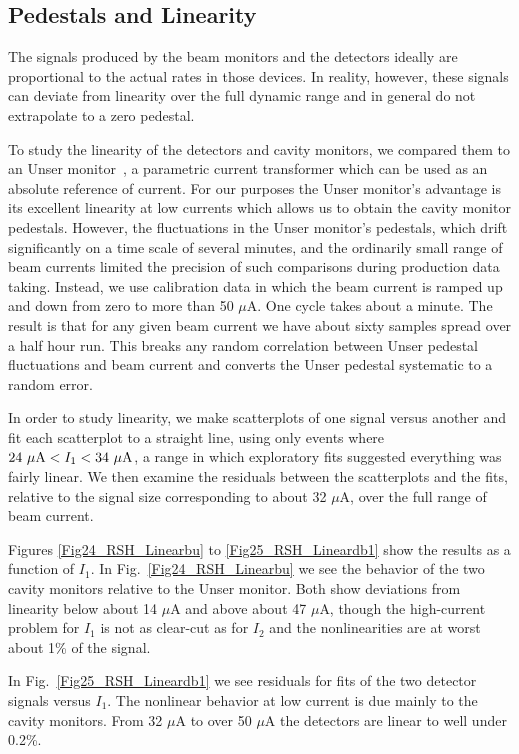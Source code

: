 
\subsection{Pedestals and Linearity}

The signals produced by the beam monitors and the detectors
ideally are proportional to the actual rates in those devices.  In
reality, however, these signals can deviate from linearity over the
full dynamic range and in general do not extrapolate to a zero
pedestal.  

To study the linearity of the detectors and cavity monitors, 
we compared them to an Unser monitor~\cite{Unser},
a parametric current transformer
which can be used as an absolute reference of current.  
For our purposes the Unser monitor's advantage
is its excellent linearity at low currents
which allows us to obtain the cavity monitor pedestals.
However, the fluctuations in the Unser monitor's pedestals, 
which drift significantly on a time scale of 
several minutes, and the ordinarily small 
range of beam currents limited 
the precision of such comparisons during production data taking.
Instead, we use calibration data in which the beam
current is ramped up and down from zero to more 
than 50 $\mu$A.  One cycle takes about a minute.  
The result is that for any given beam
current we have about sixty samples spread over 
a half hour run.  This breaks any random correlation 
between Unser pedestal fluctuations and
beam current and converts the Unser pedestal systematic 
to a random error.

In order to study linearity, we make scatterplots of one signal versus
another and  fit each scatterplot to a straight line, using only
events where $24~\mu{\rm A} < I_1 < 34~\mu{\rm A}$, a range in which
exploratory fits suggested everything was fairly linear.  We then
examine the residuals between the scatterplots and the fits, relative
to the signal size corresponding to about 32 $\mu$A, over the full
range of beam current.

Figures \ref{Fig24_RSH_Linearbu} to \ref{Fig25_RSH_Lineardb1} show the 
results as a
function of $I_1$.  
In Fig.~\ref{Fig24_RSH_Linearbu}
we see the behavior of the two cavity monitors relative to the
Unser monitor.  Both show deviations from linearity below about 14
$\mu$A and above about 47 $\mu$A, though the high-current problem for
$I_1$ is not as clear-cut as for $I_2$ and the nonlinearities are at
worst about 1\% of the signal.

In Fig.~\ref{Fig25_RSH_Lineardb1} we see residuals for fits of the
two detector signals versus $I_1$.  The nonlinear behavior at low
current is due mainly to the cavity monitors.  From 32 $\mu$A to over
50 $\mu$A the detectors are linear to well under 0.2\%.


